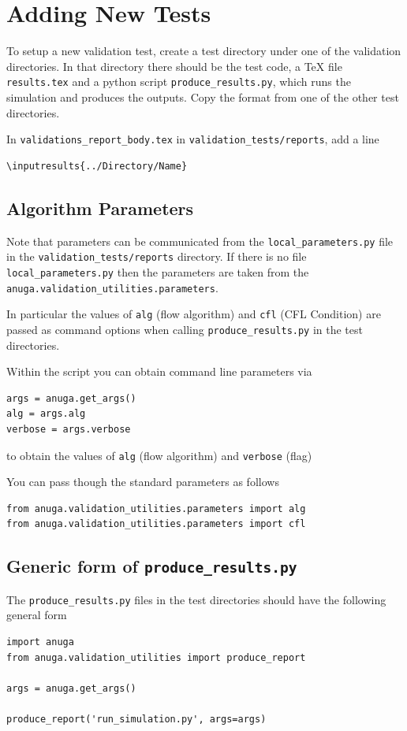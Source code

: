 \appendix
\chapter{Adding New Tests}


To setup a new validation test, create a test directory under one of
the validation directories. In that directory there should be the test code, a
\TeX{} file \texttt{results.tex} and a python script
\texttt{produce\_results.py}, which runs the simulation and produces the
outputs. Copy the format from one of the other test directories.

In \texttt{validations\_report\_body.tex} in \texttt{validation\_tests/reports}, add a line
\begin{verbatim}
\inputresults{../Directory/Name}
\end{verbatim}



\section{Algorithm Parameters}
Note that parameters can be communicated from the \verb|local_parameters.py|
file in the \verb|validation_tests/reports| directory. If there is no file
\verb|local_parameters.py| then the parameters are taken from the
\verb|anuga.validation_utilities.parameters|.

In particular the
values of \verb|alg| (flow algorithm) and \verb|cfl| (CFL Condition)
are passed as command options when calling \verb|produce_results.py| in the
test directories.

Within the \anuga{} script you can obtain command line parameters via
\begin{verbatim}
args = anuga.get_args()
alg = args.alg
verbose = args.verbose
\end{verbatim}
to obtain the values of \verb|alg| (flow algorithm) and \verb|verbose| (flag)

You can pass though the standard parameters as follows
\begin{verbatim}
from anuga.validation_utilities.parameters import alg
from anuga.validation_utilities.parameters import cfl
\end{verbatim}

\pagebreak
\section{Generic form of \texttt{produce\_results.py}}

The \texttt{produce\_results.py} files in the test directories should have the
following general form

\begin{verbatim}
import anuga
from anuga.validation_utilities import produce_report

args = anuga.get_args()

produce_report('run_simulation.py', args=args)
\end{verbatim}
